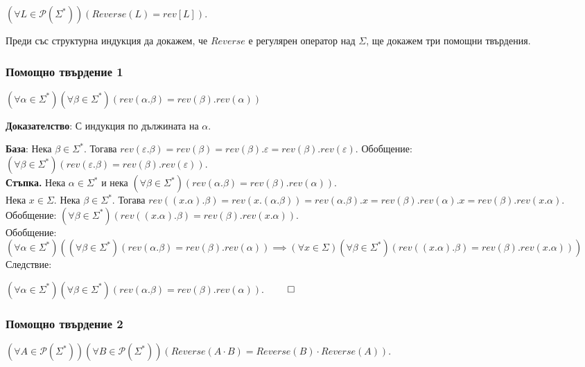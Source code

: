 \documentclass[12pt]{article}
\begin{document}
\((\forall L \in \mathcal{P}(\Sigma^*))(Reverse(L) = rev[L])\).

Преди със структурна индукция да докажем, че \(Reverse\) е регулярен оператор над \(\Sigma\),
ще докажем три помощни твърдения.

\subsubsection*{Помощно твърдение 1}
\((\forall \alpha \in \Sigma^*)(\forall \beta \in \Sigma^*)(rev(\alpha.\beta) = rev(\beta).rev(\alpha))\)

\vspace*{5mm}

\textbf{Доказателство}: С индукция по дължината на \(\alpha\). \\

\vspace*{5mm}

\textbf{База}: Нека \(\beta \in \Sigma^*\). Тогава
\(rev(\varepsilon.\beta) = rev(\beta) = rev(\beta).\varepsilon = rev(\beta).rev(\varepsilon)\).
Обобщение: \((\forall \beta \in \Sigma^*)(rev(\varepsilon.\beta) = rev(\beta).rev(\varepsilon))\). \\

\textbf{Стъпка.}
Нека \(\alpha \in \Sigma^*\) и нека
\((\forall \beta \in \Sigma^*)(rev(\alpha.\beta) = rev(\beta).rev(\alpha))\).  \\

Нека \(x \in \Sigma\). Нека \(\beta \in \Sigma^*\). Тогава
\(rev((x.\alpha).\beta) = rev(x.(\alpha.\beta)) = rev(\alpha.\beta).x = rev(\beta).rev(\alpha).x = rev(\beta).rev(x.\alpha)\). \\

Обобщение: \((\forall \beta \in \Sigma^*)(rev((x.\alpha).\beta) = rev(\beta).rev(x.\alpha))\). \\

Обобщение: \((\forall \alpha \in \Sigma^*)((\forall \beta \in \Sigma^*)(rev(\alpha.\beta) = rev(\beta).rev(\alpha)) \implies (\forall x \in \Sigma)(\forall \beta \in \Sigma^*)(rev((x.\alpha).\beta) = rev(\beta).rev(x.\alpha))  )\) \\

Следствие: 

\((\forall \alpha \in \Sigma^*)(\forall \beta \in \Sigma^*)(rev(\alpha.\beta) = rev(\beta).rev(\alpha))\). \(\qed\)

\subsubsection*{Помощно твърдение 2}
\((\forall A \in \mathcal{P}(\Sigma^*))(\forall B \in \mathcal{P}(\Sigma^*))( Reverse(A \cdot B) = Reverse(B) \cdot Reverse(A))\).
\end{document}
